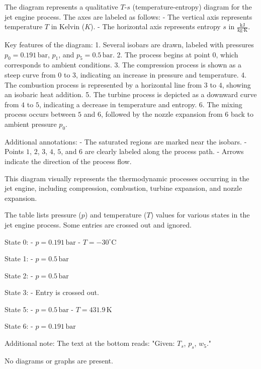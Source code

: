 The diagram represents a qualitative \( T \)-\( s \) (temperature-entropy) diagram for the jet engine process. The axes are labeled as follows:  
- The vertical axis represents temperature \( T \) in Kelvin (\( K \)).  
- The horizontal axis represents entropy \( s \) in \( \frac{\text{kJ}}{\text{kg·K}} \).  

Key features of the diagram:  
1. Several isobars are drawn, labeled with pressures \( p_0 = 0.191 \, \text{bar} \), \( p_1 \), and \( p_5 = 0.5 \, \text{bar} \).  
2. The process begins at point \( 0 \), which corresponds to ambient conditions.  
3. The compression process is shown as a steep curve from \( 0 \) to \( 3 \), indicating an increase in pressure and temperature.  
4. The combustion process is represented by a horizontal line from \( 3 \) to \( 4 \), showing an isobaric heat addition.  
5. The turbine process is depicted as a downward curve from \( 4 \) to \( 5 \), indicating a decrease in temperature and entropy.  
6. The mixing process occurs between \( 5 \) and \( 6 \), followed by the nozzle expansion from \( 6 \) back to ambient pressure \( p_0 \).  

Additional annotations:  
- The saturated regions are marked near the isobars.  
- Points \( 1 \), \( 2 \), \( 3 \), \( 4 \), \( 5 \), and \( 6 \) are clearly labeled along the process path.  
- Arrows indicate the direction of the process flow.  

This diagram visually represents the thermodynamic processes occurring in the jet engine, including compression, combustion, turbine expansion, and nozzle expansion.

The table lists pressure (\( p \)) and temperature (\( T \)) values for various states in the jet engine process. Some entries are crossed out and ignored.  

State 0:  
- \( p = 0.191 \, \text{bar} \)  
- \( T = -30^\circ\text{C} \)  

State 1:  
- \( p = 0.5 \, \text{bar} \)  

State 2:  
- \( p = 0.5 \, \text{bar} \)  

State 3:  
- Entry is crossed out.  

State 5:  
- \( p = 0.5 \, \text{bar} \)  
- \( T = 431.9 \, \text{K} \)  

State 6:  
- \( p = 0.191 \, \text{bar} \)  

Additional note:  
The text at the bottom reads:  
"Given: \( T_s \), \( p_s \), \( w_5 \)."  

No diagrams or graphs are present.